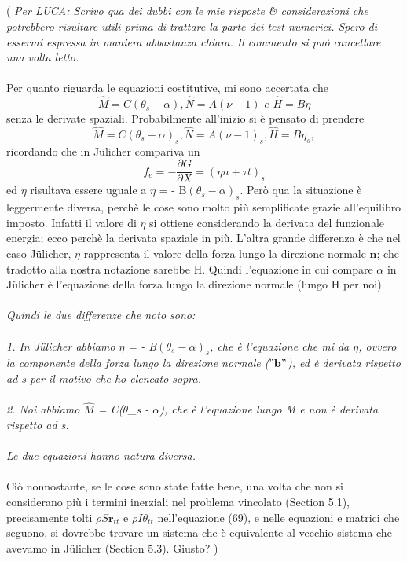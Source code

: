 \documentclass{article}
\begin{document}
\\\\\\\\
( \emph{Per LUCA: Scrivo qua dei dubbi con le mie risposte & considerazioni che potrebbero risultare utili prima di trattare la parte dei test numerici. Spero di essermi espressa in maniera abbastanza chiara.
Il commento si può cancellare una volta letto.}
\\\\
Per quanto riguarda le equazioni costitutive, mi sono accertata che 
\[ \hat{M} = C(\theta_s -\alpha), \hat{N} = A(\nu - 1) \,\,e\,\, \hat{H} = B\eta \]
senza le derivate spaziali. Probabilmente all'inizio si è pensato di prendere 
\[ \hat{M} = C(\theta_s -\alpha)_s, \hat{N} = A(\nu - 1)_s, \hat{H} = B\eta _s, \] 
ricordando che in Jülicher compariva un 
\[ f_e = - \frac{\partial G}{\partial X} =(\eta n + \tau t)_s \]
ed $\eta$ risultava essere uguale a $\eta$ = - B$(\theta_s - \alpha)_s$. Però qua la situazione è leggermente diversa, perchè le cose sono molto più semplificate grazie all'equilibro imposto.
Infatti il valore di $\eta$ si ottiene considerando la derivata del funzionale energia; ecco perchè la derivata spaziale in più.
L'altra grande differenza è che nel caso Jülicher, $\eta$ rappresenta il valore della forza lungo la direzione normale $\mathbf{n}$; che tradotto alla nostra notazione sarebbe H. Quindi l'equazione in cui compare $\alpha$ in Jülicher è l'equazione della forza lungo la direzione normale (lungo H per noi).
\\\\
\emph{Quindi le due differenze che noto sono:}
\\\\
\emph{1. In Jülicher abbiamo $\eta$ = - B$(\theta_s - \alpha)_s$, che è l'equazione che mi da $\eta$, ovvero la componente della forza lungo la direzione normale ($"\mathbf{b}"$), ed è derivata rispetto ad s per il motivo che ho elencato sopra.}
\\\\
\emph{2. Noi abbiamo $\hat{M}$ = C($\theta$_s - $\alpha$), che è l'equazione lungo M e non è derivata rispetto ad s.}
\\\\
\emph{Le due equazioni hanno natura diversa.}
\\\\
Ciò nonnostante, se le cose sono state fatte bene, una volta che non si considerano più i termini inerziali nel problema vincolato (Section 5.1),  precisamente tolti $\rho S \mathbf{r}_{tt}$ e $\rho I \theta_{tt}$ nell'equazione (69), e nelle equazioni e matrici che seguono, si dovrebbe trovare un sistema che è equivalente al vecchio sistema che avevamo in Jülicher (Section 5.3). Giusto? )
\end{document}
